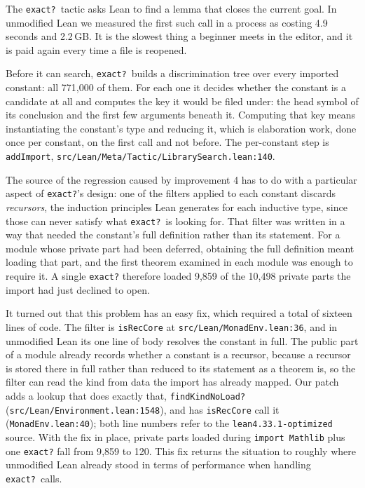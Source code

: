 \documentclass{article}
\newcommand{\Lean}{Lean\xspace}      %
\newcommand{\altlean}{\texttt{lean4.33.1-\allowbreak optimized}\xspace}
\begin{document}
The \texttt{exact?}\ tactic asks \Lean to find a lemma that closes the current goal. In unmodified \Lean we measured the first such call in a process as costing 4.9 seconds and 2.2\,GB. It is the slowest thing a beginner meets in the editor, and it is paid again every time a file is reopened.

Before it can search, \texttt{exact?}\ builds a discrimination tree over every imported constant: all 771{,}000 of them. For each one it decides whether the constant is a candidate at all and computes the key it would be filed under: the head symbol of its conclusion and the first few arguments beneath it. Computing that key means instantiating the constant's type and reducing it, which is elaboration work, done once per constant, on the first call and not before. The per-constant step is \texttt{addImport}, \texttt{src/Lean/Meta/Tactic/LibrarySearch.lean:140}.

The source of the regression caused by improvement 4 has to do with a particular aspect of \texttt{exact?}'s design: one of the filters applied to each constant discards \emph{recursors}, the induction principles \Lean generates for each inductive type, since those can never satisfy what \texttt{exact?}\ is looking for. That filter was written in a way that needed the constant's full definition rather than its statement. For a module whose private part had been deferred, obtaining the full definition meant loading that part, and the first theorem examined in each module was enough to require it. A single \texttt{exact?} therefore loaded 9{,}859 of the 10{,}498 private parts the import had just declined to open.

It turned out that this problem has an easy fix, which required a total of sixteen lines of code. The filter is \texttt{isRecCore} at \texttt{src/Lean/MonadEnv.lean:36}, and in unmodified \Lean its one line of body resolves the constant in full. The public part of a module already records whether a constant is a recursor, because a recursor is stored there in full rather than reduced to its statement as a theorem is, so the filter can read the kind from data the import has already mapped. Our patch adds a lookup that does exactly that, \texttt{findKindNoLoad?} (\texttt{src/Lean/Environment.lean:1548}), and has \texttt{isRecCore} call it (\texttt{MonadEnv.lean:40}); both line numbers refer to the \altlean source. With the fix in place, private parts loaded during \texttt{import Mathlib} plus one \texttt{exact?} fall from 9{,}859 to 120. This fix returns the situation to roughly where unmodified \Lean already stood in terms of performance when handling \texttt{exact?}\ calls.
\end{document}

